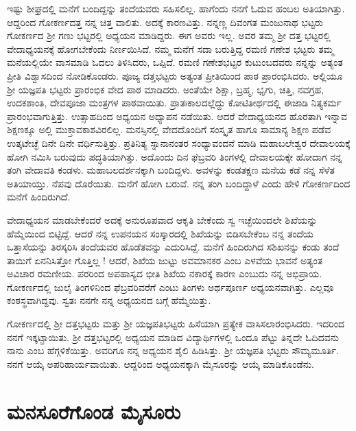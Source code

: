 {ಇಷ್ಟು ಶೀಘ್ರದಲ್ಲಿ ಮನೆಗೆ ಬಂದಿದ್ದನ್ನು ತಂದೆಯವರು ಸಹಿಸಲಿಲ್ಲ. ಹಾಗೆಂದು ನನಗೆ ಓದುವ ಹಂಬಲ ಅತಿಯಾಗಿತ್ತು.  ಆದ್ದರಿಂದ ಗೋಕರ್ಣದತ್ತ ನನ್ನ ಚಿತ್ತ ವಾಲಿತು.  ಅದಕ್ಕೆ ಕಾರಣವಿತ್ತು.  ನನ್ನಣ್ಣ ದಿವಂಗತ ಮಂಜುನಾಥ ಭಟ್ಟರು ಗೋಕರ್ಣದ ಶ್ರೀ ಗಣು ಭಟ್ಟರಲ್ಲಿ ಅಧ್ಯಯನ ಮಾಡಿದ್ದರು. ಈಗ ಅವರು ಇಲ್ಲ.  ಅವರ ತಮ್ಮ ಶ್ರೀ ದತ್ತ \hbox{ಭಟ್ಟರಲ್ಲಿ} ವೇದಾಧ್ಯಯನಕ್ಕೆ ಹೋಗಬೇಕೆಂದು ನಿರ್ಣಯಿಸಿದೆ.  ನಮ್ಮ ಮನೆಗೆ ಸದಾ ಬರುತ್ತಿದ್ದ ರಮಣಿ ಗಣೇಶ ಭಟ್ಟರು ತಮ್ಮ ಮನೆಯಲ್ಲಿಯೇ ವಾಸಮಾಡಿ ಓದಲು \hbox{ತಿಳಿಸಿದರು,}  ಒಪ್ಪಿದೆ.  ರಮಣಿ ಗಣೇಶಭಟ್ಟರ ಕುಟುಂಬದವರು ನನ್ನನ್ನು ಅತ್ಯಂತ ಪ್ರೀತಿ ವಿಶ್ವಾಸದಿಂದ ನೋಡಿಕೊಂಡರು.  ಪೂಜ್ಯ ದತ್ತಭಟ್ಟರು ಅತ್ಯಂತ ಪ್ರೀತಿಯಿಂದ ಪಾಠ ಪ್ರಾರಂಭಿ\-ಸಿದರು.  ಅಲ್ಲಿಯೂ ಶ್ರೀ ಯಜ್ಞಪತಿ ಭಟ್ಟರು ಪ್ರಾರಂಭಿಕ ವೇದ ಪಾಠ \hbox{ಮಾಡಿದರು.}  ಅಂತೆಯೇ ಶಿಕ್ಷಾ, ಬ್ರಹ್ಮ, ಭೃಗು, ಚಿತ್ತಿ, ನವಗ್ರಹ, ಉದಕಶಾಂತಿ, ದೇವಪೂಜಾ \hbox{ಮಂತ್ರಗಳ} ಪಾಠ\-ವಾಯಿತು.  ಪ್ರಾತಃಕಾಲದಲ್ಲೆದ್ದು ಕೋಟಿತೀರ್ಥದಲ್ಲಿ ಈಜಾಡಿ ನಿತ್ಯಕರ್ಮ ಪ್ರಾರಂಭವಾಗುತ್ತಿತ್ತು.  ಉತ್ಸಾಹದಿಂದ ಅಧ್ಯಯನ  \enginline{-}  ಅಧ್ಯಾಪನ ನಡೆಯಿತು.  ಆದರೆ ವೇದಾಧ್ಯಯನದ ಹೊರತಾಗಿ ಇನ್ನಾವ ಶಿಕ್ಷಣಕ್ಕೂ ಅಲ್ಲಿ ಮುಕ್ತಾವಕಾಶವಿರಲಿಲ್ಲ.  \hbox{ಮನಸ್ಸಿನಲ್ಲಿ} ವೇದದೊಂದಿಗೆ ಸಂಸ್ಕೃತ ಹಾಗೂ ಸಾಮಾನ್ಯ ಶಿಕ್ಷಣ ಪಡೆವ ಉತ್ಕಟೇಚ್ಛೆ ದಿನೇ ದಿನೇ ವರ್ಧಿಸುತ್ತಿತ್ತು.  ಪ್ರತಿನಿತ್ಯ ಸ್ನಾನಾನಂತರ ಸಂಧ್ಯಾವಂದನೆ ಮಾಡಿ ಮಹಾಬಲೇಶ್ವರ ದೇವಾಲಯಕ್ಕೆ ಹೋಗಿ ನಮಿಸಿ ಬರುವುದು ಪದ್ಧತಿಯಾಗಿತ್ತು.  ಅದೊಂದು ದಿನ \hbox{ಫೆಬ್ರವರಿ} ತಿಂಗಳಲ್ಲಿ ದೇವಾಲಯಕ್ಕೇ ಹೋದಾಗ ನನ್ನ ತಂಗಿ ವೇದಾವತಿ ಕಂಡಳು.  ಮಹಾಬಲದರ್ಶನಕ್ಕಾಗಿ ಬಂದಿದ್ದಳು.  ಅವಳನ್ನು ಕಂಡತಕ್ಷಣ ಮನೆಯ ಕಡೆ ನನ್ನ ಸೆಳೆತ ಅತಿಯಾಯ್ತು.  ನೆಪವು ದೊರೆಯಿತು.  ಮನೆಗೆ ಹೋಗಿ ಬರುವೆ. ನನ್ನ ತಂಗಿ ಬಂದಿದ್ದಾಳೆ ಎಂದು ಹೇಳಿ ಗೋಕರ್ಣದಿಂದ ಮನೆಗೆ ಹಿಂದಿರುಗಿದೆ.  

ವೇದಾಧ್ಯಯನ ಮಾಡಬೇಕೆಂದರೆ ಅದಕ್ಕೆ ಅನುರೂಪವಾದ ಆಕೃತಿ ಬೇಕೆಂದು ಸ್ವ ಇಚ್ಛೆಯಿಂದಲೇ ಶಿಖೆಯನ್ನು ಹೆಮ್ಮೆಯಿಂದ ಬಿಟ್ಟಿದ್ದೆ.  ಆದರೆ ನನ್ನ ಉಪನಯನ ಸಂಸ್ಕಾರ\-ದಲ್ಲಿ ಶಿಖೆಯನ್ನು ಬಿಡಿಸಬೇಕೆಂಬ ನನ್ನ ತಂದೆಯ ಒತ್ತಾಸೆಯನ್ನು ತಿರಸ್ಕರಿಸಿ \hbox{ತಂದೆಯವರ} ಹೊಡೆತವನ್ನು ಎದುರಿಸಿದ್ದೆ.  ಮನೆಗೆ ಹಿಂದಿರುಗಿದ ಸಶಿಖನನ್ನು ಕಂಡು ತಂದೆ \enginline{-}ತಾಯಿಗೆ ಏನನಿಸಿತ್ತೋ ಗೊತ್ತಿಲ್ಲ !  ಆದರೆ, ಶಿಖೆಯ ಜುಟ್ಟು ಅವಮಾನಕರ ಎಂಬ ಎಳವೆಯ ಭಾವನೆ ಅತ್ಯಂತ ಅವಿಚಾರ ರಮಣೀಯ. ಪರರಿಂದ ಅಪಹಾಸ್ಯದ ಭೀತಿ ಶಿಖೆಯ ನಕಾರಕ್ಕೆ ಕಾರಣ ಎಂಬುದು ನನ್ನ ಅಭಿಪ್ರಾಯ.  ಗೋಕರ್ಣದಲ್ಲಿ ಜುಲೈ ತಿಂಗಳಿನಿಂದ ಫೆಬ್ರವರಿವರೆಗೆ ಎಂಟು ತಿಂಗಳು ಅರ್ಥಪೂರ್ಣ ಅಧ್ಯಯನವಾಗಿತ್ತು.  ಎಲ್ಲವೂ ಕಂಠಸ್ಥ\-ವಾಗಿದ್ದವು.  ಸ್ವತಃ ನನಗೇ ನನ್ನ ಅಧ್ಯಯನದ ಬಗ್ಗೆ ಹೆಮ್ಮೆಯಿತ್ತು.

ಗೋಕರ್ಣದಲ್ಲಿ ಶ್ರೀ ದತ್ತಭಟ್ಟರು ಮತ್ತು ಶ್ರೀ ಯಜ್ಞಪತಿಭಟ್ಟರು ಹಿಸೆಯಾಗಿ ಪ್ರತ್ಯೇಕ ವಾಸಿಸಲಾರಂಭಿಸಿದರು.  ಇದರಿಂದ ನನಗೆ ಇಕ್ಕಟ್ಟಾಯಿತು. ಶ್ರೀ \hbox{ದತ್ತಭಟ್ಟರಲ್ಲಿ} ಅಧ್ಯಯನ ಮಾಡಿದ ವಿದ್ಯಾರ್ಥಿಗಳಲ್ಲಿ ಒಂದೂ ಪೆಟ್ಟು ತಿನ್ನದೇ ಓದಿದವನು ನಾನು ಎಂಬ ಹೆಗ್ಗಳಿಕೆಯಿತ್ತು.  ಅವರಿಗೂ ನನ್ನ ಅಧ್ಯಯನ ಶೈಲಿ ಹಿಡಿಸಿತ್ತು.  ಶ್ರೀ \hbox{ಯಜ್ಞಪತಿ} ಭಟ್ಟರು ಸೌಮ್ಯಮೂರ್ತಿ. ನನಗೆ ಆಯ್ಕೆ ಅಪರಿಹಾರ್ಯವಾಯಿತು.  ಆದ್ದರಿಂದ ಅಧ್ಯಯನ\-ಕ್ಕಾಗಿ ಮೈಸೂರನ್ನು ಆಯ್ಕೆ ಮಾಡಿಕೊಂಡೆನು.

\section*{ಮನಸೂರೆಗೊಂಡ ಮೈಸೂರು}

}
